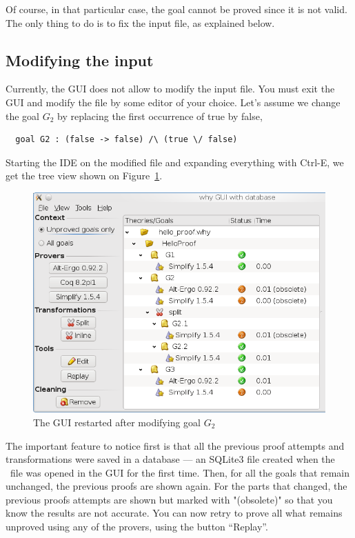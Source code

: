 Of course, in that particular case, the goal cannot be proved since it
is not valid. The only thing to do is to fix the input file, as
explained below.

\subsection{Modifying the input}

Currently, the GUI does not allow to modify the input file. You must
exit the GUI and modify the file by some editor of your choice. Let's assume we change the goal $G_2$ by replacing the first occurrence of true by false, \eg
\begin{verbatim}
  goal G2 : (false -> false) /\ (true \/ false)
\end{verbatim}
Starting the IDE on the modified file and expanding everything with
\textsf{Ctrl-E}, we get the tree view shown on Figure~\ref{fig:gui5}.

\begin{figure}[tbp]
  \includegraphics[width=\textwidth]{gui5.png}
  \caption{The GUI restarted after modifying goal $G_2$}
  \label{fig:gui5}
\end{figure}

The important feature to notice first is that all the previous proof
attempts and transformations were saved in a database --- an SQLite3
file created when the \why\ file was opened in the GUI for the first
time. Then, for
all the goals that remain unchanged, the previous proofs are shown
again. For the parts that changed, the previous proofs attempts are
shown but marked with "(obsolete)" so that you know the results are
not accurate. You can now retry to prove all what remains unproved
using any of the provers, using the button ``Replay''.

